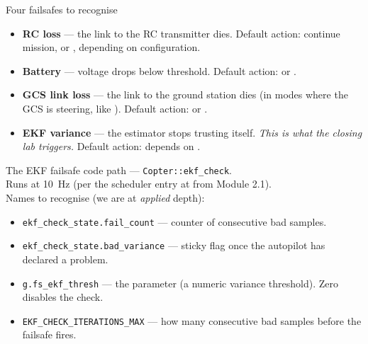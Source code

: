 \documentclass[aspectratio=169,11pt]{beamer}
\begin{document}
\begin{frame}{Four failsafes to recognise}
  \begin{itemize}
    \item \textbf{RC loss} --- the link to the RC transmitter dies. Default action: continue mission, or , depending on configuration.
    \item \textbf{Battery} --- voltage drops below threshold. Default action:  or .
    \item \textbf{GCS link loss} --- the link to the ground station dies (in modes where the GCS is steering, like ). Default action:  or .
    \item \textbf{EKF variance} --- the estimator stops trusting itself. \emph{This is what the closing lab triggers.} Default action: depends on .
  \end{itemize}
\end{frame}

\begin{frame}{The EKF failsafe code path}
   --- \texttt{Copter::ekf\_check}.\\[1ex]
  Runs at 10~Hz (per the scheduler entry at  from Module 2.1).\\[1ex]
  Names to recognise (we are at \emph{applied} depth):
  \begin{itemize}
    \item \texttt{ekf\_check\_state.fail\_count} --- counter of consecutive bad samples.
    \item \texttt{ekf\_check\_state.bad\_variance} --- sticky flag once the autopilot has declared a problem.
    \item \texttt{g.fs\_ekf\_thresh} --- the parameter  (a numeric variance threshold). Zero disables the check.
    \item \texttt{EKF\_CHECK\_ITERATIONS\_MAX} --- how many consecutive bad samples before the failsafe fires.
  \end{itemize}
\end{frame}
\end{document}
